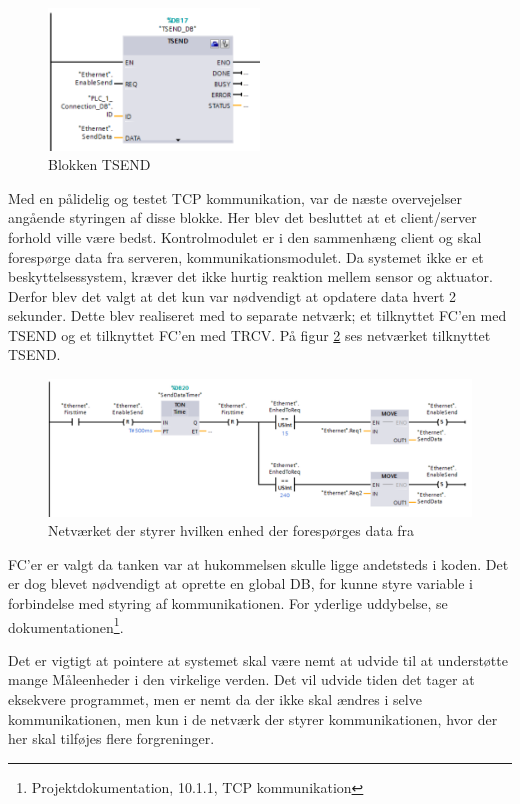 \begin{figure}[H] %
	\centering
	\includegraphics[width=0.5\textwidth]{Figure/TSEND}
	\caption{Blokken TSEND}
	\label{fig:TSEND}
\end{figure}


Med en pålidelig og testet TCP kommunikation, var de næste overvejelser angående styringen af disse blokke. Her blev det besluttet at et client/server forhold ville være bedst. Kontrolmodulet er i den sammenhæng client og skal forespørge data fra serveren, kommunikationsmodulet.
Da systemet ikke er et beskyttelsessystem, kræver det ikke hurtig reaktion mellem sensor og aktuator. Derfor blev det valgt at det kun var nødvendigt at opdatere data hvert 2 sekunder. Dette blev realiseret med to separate netværk; et tilknyttet FC'en med TSEND og et tilknyttet FC'en med TRCV. På figur \ref{fig:ValgAfEnhedSend} ses netværket tilknyttet TSEND.

\begin{figure}[H] %
	\centering
	\includegraphics[width=1\textwidth]{Figure/valgAfEnhedSend}
	\caption{Netværket der styrer hvilken enhed der forespørges data fra}
	\label{fig:ValgAfEnhedSend}
\end{figure}

FC'er er valgt da tanken var at hukommelsen skulle ligge andetsteds i koden. Det er dog blevet nødvendigt at oprette en global DB, for kunne styre variable i forbindelse med styring af kommunikationen. For yderlige uddybelse, se dokumentationen\footnote{Projektdokumentation, 10.1.1, TCP kommunikation}.


Det er vigtigt at pointere at systemet skal være nemt at udvide til at understøtte mange Måleenheder i den virkelige verden. Det vil udvide tiden det tager at eksekvere programmet, men er nemt da der ikke skal ændres i selve kommunikationen, men kun i de netværk der styrer kommunikationen, hvor der her skal tilføjes flere forgreninger.

